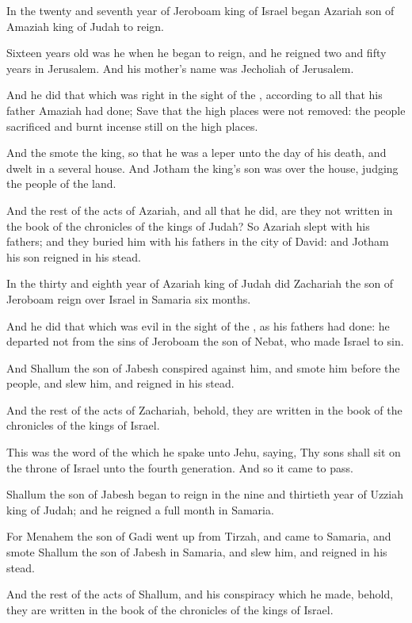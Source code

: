 \Chapter
\Verse In the twenty and seventh year of Jeroboam king of Israel began Azariah son of Amaziah king of Judah to reign.

\Verse Sixteen years old was he when he began to reign, and he reigned two and fifty years in Jerusalem. And his mother's name was Jecholiah of Jerusalem.

\Verse And he did that which was right in the sight of the \LORD, according to all that his father Amaziah had done; \Verse Save that the high places were not removed: the people sacrificed and burnt incense still on the high places.

\Verse And the \LORD smote the king, so that he was a leper unto the day of his death, and dwelt in a several house. And Jotham the king's son was over the house, judging the people of the land.

\Verse And the rest of the acts of Azariah, and all that he did, are they not written in the book of the chronicles of the kings of Judah?  \Verse So Azariah slept with his fathers; and they buried him with his fathers in the city of David: and Jotham his son reigned in his stead.

\Verse In the thirty and eighth year of Azariah king of Judah did Zachariah the son of Jeroboam reign over Israel in Samaria six months.

\Verse And he did that which was evil in the sight of the \LORD, as his fathers had done: he departed not from the sins of Jeroboam the son of Nebat, who made Israel to sin.

\Verse And Shallum the son of Jabesh conspired against him, and smote him before the people, and slew him, and reigned in his stead.

\Verse And the rest of the acts of Zachariah, behold, they are written in the book of the chronicles of the kings of Israel.

\Verse This was the word of the \LORD which he spake unto Jehu, saying, Thy sons shall sit on the throne of Israel unto the fourth generation.  And so it came to pass.

\Verse Shallum the son of Jabesh began to reign in the nine and thirtieth year of Uzziah king of Judah; and he reigned a full month in Samaria.

\Verse For Menahem the son of Gadi went up from Tirzah, and came to Samaria, and smote Shallum the son of Jabesh in Samaria, and slew him, and reigned in his stead.

\Verse And the rest of the acts of Shallum, and his conspiracy which he made, behold, they are written in the book of the chronicles of the kings of Israel.

